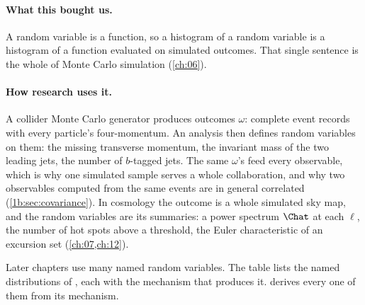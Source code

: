 \paragraph{What this bought us.} A random variable is a function, so a
histogram of a random variable is a histogram of a function evaluated on
simulated outcomes. That single sentence is the whole of Monte Carlo
simulation (\cref{ch:06}).

\paragraph{How research uses it.} A collider Monte Carlo generator produces
outcomes $\omega$: complete event records with every particle's
four-momentum. An analysis then defines random variables on them: the missing
transverse momentum, the invariant mass of the two leading jets, the number of
$b$-tagged jets. The same $\omega$'s feed every observable, which is why one
simulated sample serves a whole collaboration, and why two observables
computed from the same events are in general correlated
(\cref{1b:sec:covariance}). In cosmology the outcome is a whole simulated sky
map, and the random variables are its summaries: a power spectrum $\Chat$ at
each $\ell$, the number of hot spots above a threshold, the Euler
characteristic of an excursion set (\cref{ch:07,ch:12}).

Later chapters use many named random variables. The table lists the named
distributions of , each with the mechanism that produces
it. 
derives every one of them from its mechanism.

